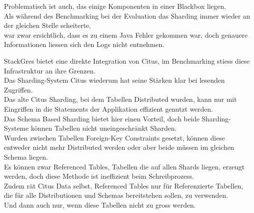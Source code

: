 \begin{flushleft}
    Problematisch ist auch, das einige Komponenten in einer Blackbox liegen.\\
    Als während des Benchmarking bei der Evaluation das Sharding immer wieder an der gleichen Stelle scheiterte,\\
    war zwar ersichtlich, dass es zu einem Java Fehler gekommen war, doch genauere Informationen liessen sich den Logs nicht entnehmen.\\
\end{flushleft}
\begin{flushleft}
    StackGres bietet eine direkte Integration von Citus, im Benchmarking stiess diese Infrastruktur an ihre Grenzen.\\
    Das Sharding-System Citus wiederum hat seine Stärken klar bei lesenden Zugriffen.\\
    Das alte Citus Sharding, bei dem Tabellen Distributed wurden, kann nur mit Eingriffen in die Statements der Applikation effizient genutzt werden.\\
    Das Schema Based Sharding bietet hier einen Vorteil, doch beide Sharding-Systeme können Tabellen nicht uneingeschränkt Sharden.\\
    Wurden zwischen Tabellen Foreign-Key Constraints gesetzt, können diese entweder nicht mehr Distributed werden oder aber beide müssen im gleichen Schema liegen.\\
    Es können zwar Referenced Tables, Tabellen die auf allen Shards liegen, erzeugt werden, doch diese Methode ist ineffizient beim Schreibprozess.\\
    Zudem rät Citus Data selbst, Referenced Tables nur für Referenzierte Tabellen, die für alle Distributionen und Schemas bereitstehen sollen, zu verwenden.\\
    Und dann auch nur, wenn diese Tabellen nicht zu gross werden.
\end{flushleft}
